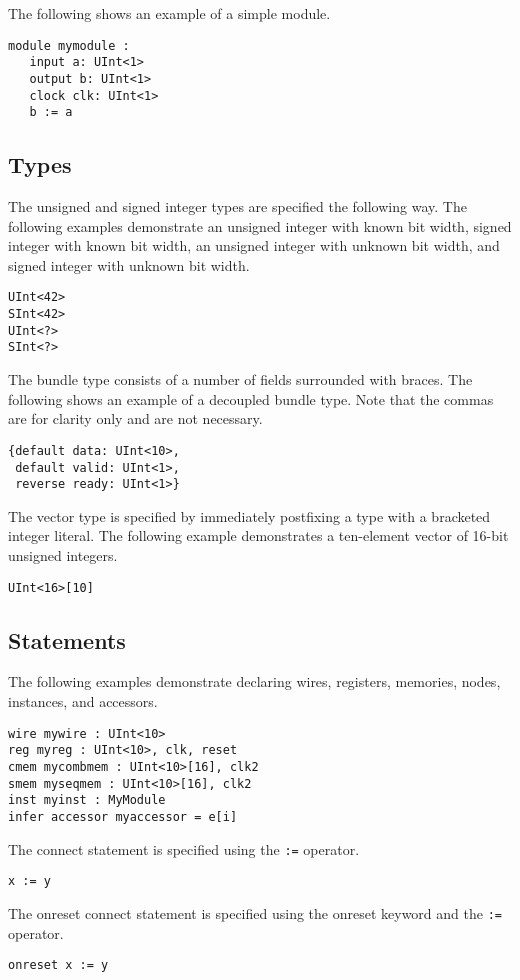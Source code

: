 \documentclass[12pt]{article}
\begin{document}
The following shows an example of a simple module.
\begin{verbatim}
module mymodule :
   input a: UInt<1>
   output b: UInt<1>
   clock clk: UInt<1>
   b := a
\end{verbatim}

\subsection*{Types}
The unsigned and signed integer types are specified the following way.
The following examples demonstrate an unsigned integer with known bit width, signed integer with known bit width, an unsigned integer with unknown bit width, and signed integer with unknown bit width.
\begin{verbatim}
UInt<42>
SInt<42>
UInt<?>
SInt<?>
\end{verbatim}

The bundle type consists of a number of fields surrounded with braces.
The following shows an example of a decoupled bundle type.
Note that the commas are for clarity only and are not necessary.
\begin{verbatim}
{default data: UInt<10>,
 default valid: UInt<1>,
 reverse ready: UInt<1>} 
\end{verbatim}

The vector type is specified by immediately postfixing a type with a bracketed integer literal.
The following example demonstrates a ten-element vector of 16-bit unsigned integers.
\begin{verbatim}
UInt<16>[10]
\end{verbatim}

\subsection*{Statements}
The following examples demonstrate declaring wires, registers, memories, nodes, instances, and accessors.
\begin{verbatim}
wire mywire : UInt<10> 
reg myreg : UInt<10>, clk, reset 
cmem mycombmem : UInt<10>[16], clk2 
smem myseqmem : UInt<10>[16], clk2 
inst myinst : MyModule 
infer accessor myaccessor = e[i] 
\end{verbatim}

The connect statement is specified using the \verb|:=| operator.
\begin{verbatim}
x := y
\end{verbatim}

The onreset connect statement is specified using the onreset keyword and the \verb|:=| operator.
\begin{verbatim}
onreset x := y 
\end{verbatim}
\end{document}
